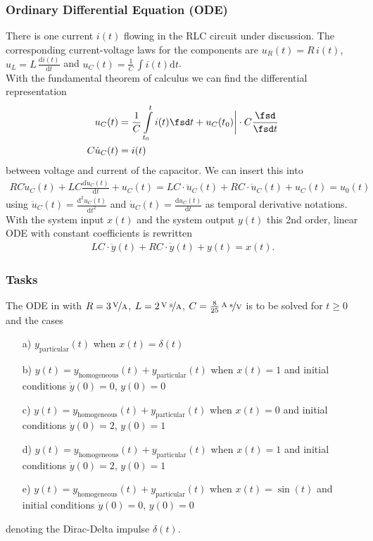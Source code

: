 \subsubsection{Ordinary Differential Equation (ODE)}
There is one current $i(t)$ flowing in the RLC circuit under discussion.
The corresponding current-voltage laws for the components are
$u_R(t) = R\,i(t)$,
$u_L = L\,\frac{\mathrm{d}i(t)}{\mathrm{d} t}$ and
$u_C(t) = \frac{1}{C} \, \int i(t) \mathrm{d}t$.\\
With the fundamental theorem of calculus we can find the differential representation
\begin{align}
\label{eq:u_c}
u_C(t) &= \frac{1}{C}\int\limits_{t_0}^{t} i(t) \fsd t+u_C(t_0) \bigg | \cdot C\frac{\fsd}{\fsd t} \nonumber \\
C\dot u_C(t) &= i(t) \nonumber
\end{align}
between voltage and current of the capacitor.
%
We can insert this into 
%
\begin{align}
RC \dot u_C(t)+LC\frac{\mathrm{d}\dot u_C(t)}{\mathrm{d}t}+u_C(t)=L C \cdot \ddot{u}_C(t) + R C \cdot \dot{u}_C(t) + u_C(t) = u_0(t)
\end{align}
using
$\ddot{u}_C(t) = \frac{\mathrm{d}^2 u_C(t)}{\mathrm{d}t^2}$ and
$\dot{u}_C(t) = \frac{\mathrm{d} u_C(t)}{\mathrm{d}t}$
as temporal derivative notations.
%
With
the system input $x(t)$ and
the system output $y(t)$ this 2nd order, linear ODE with
constant coefficients is rewritten
\begin{align}
\label{eq:ODE_RLC}
L C \cdot \ddot{y}(t) + R C \cdot \dot{y}(t) + y(t) = x(t).
\end{align}



\subsubsection{Tasks}
The ODE in  with
$R = 3\,\nicefrac{\text{V}}{\text{A}}$,
$L=2\,\nicefrac{\text{V s}}{\text{A}}$,
$C=\frac{8}{25}\,\nicefrac{\text{A s}}{\text{V}}$
is to be solved for $t\geq 0$ and the cases
\begin{itemize}
\item[a)] $y_\text{particular}(t)$ when $x(t)=\delta(t)$
\item[b)] $y(t) = y_\text{homogeneous}(t)+y_\text{particular}(t)$ when
$x(t)=1$ and initial conditions $\dot{y}(0) = 0$, $y(0)=0$
\item[c)] $y(t) = y_\text{homogeneous}(t)+y_\text{particular}(t)$ when $x(t)=0$
and initial conditions $\dot{y}(0) = 2$, $y(0)=1$
\item[d)] $y(t) = y_\text{homogeneous}(t)+y_\text{particular}(t)$ when $x(t)=1$
and initial conditions $\dot{y}(0) = 2$, $y(0)=1$
\item[e)] $y(t) = y_\text{homogeneous}(t)+y_\text{particular}(t)$ when $x(t)=\sin(t)$
and initial conditions $\dot{y}(0) = 0$, $y(0)=0$
\end{itemize}
denoting the Dirac-Delta impulse $\delta(t)$.
%

